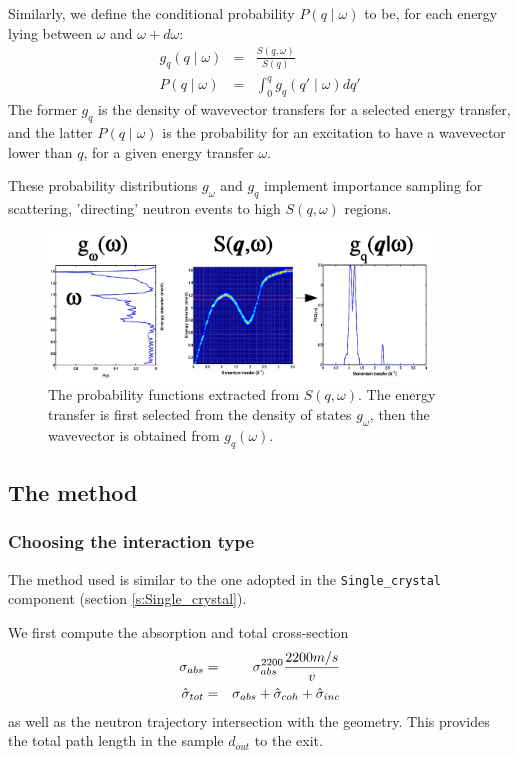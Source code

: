 Similarly, we define the conditional probability $P(q \mid \omega)$ to be, for each energy lying between $\omega$ and $\omega+d\omega$:
\begin{eqnarray}\label{eq:Pqw}
g_q(q\mid\omega) &=& \frac{S(q, \omega)}{S(q)} \\
P(q \mid \omega)    &=& \int_0^q g_q(q'\mid\omega) dq'
\end{eqnarray}
The former $g_q$ is the density of wavevector transfers for a selected energy transfer, and the latter $P(q \mid \omega)$ is the probability for an excitation to have a wavevector lower than $q$, for a given energy transfer $\omega$.

These probability distributions $g_\omega$ and $g_q$ implement importance sampling for scattering, 'directing' neutron events to high $S(q,\omega)$ regions.

\begin{figure}
  \begin{center}
    \includegraphics[width=0.9\textwidth]{figures/Sqw_sampling.eps}
  \end{center}
\caption{The probability functions extracted from $S(q,\omega)$. The energy transfer is first selected from the density of states $g_\omega$, then the wavevector is obtained from $g_q(\omega)$.}
\label{f:isotropic-sqw-proba}
\end{figure}


\subsection{The method}

\subsubsection{Choosing the interaction type}

The method used is similar to the one adopted in the \verb+Single_crystal+ component (section \ref{s:Single_crystal}).

We first compute the absorption and total cross-section
\begin{eqnarray}
\sigma_{abs} &=& \sigma_{abs}^{{\rm 2200}}\frac{2200 m/s}{v} \\
\hat{\sigma}_{tot} &=& \sigma_{abs} + \hat{\sigma}_{coh} + \hat{\sigma}_{inc}
\end{eqnarray}
as well as the neutron trajectory intersection with the geometry. This provides the total path length in the sample $d_{out}$ to the exit.

